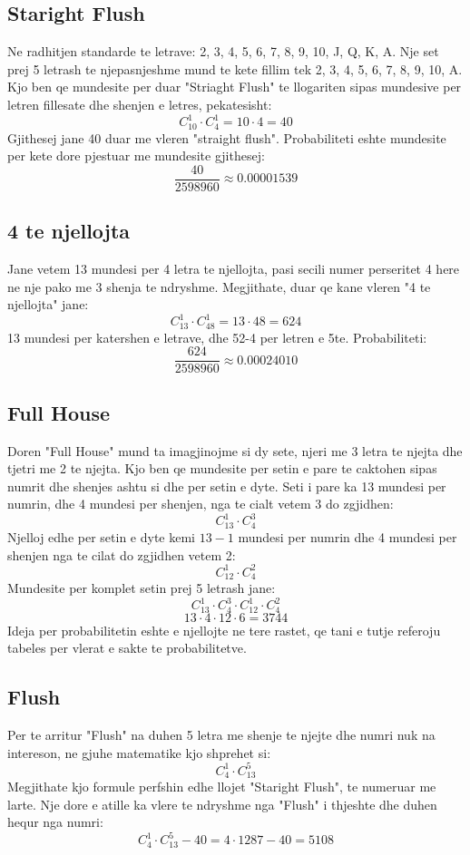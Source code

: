 \documentclass[a4paper]{article}
\begin{document}
\subsection*{Staright Flush}
Ne radhitjen standarde te letrave: 2, 3, 4, 5, 6, 7, 8, 9, 10, J, Q, K, A. Nje set prej 5 letrash te njepasnjeshme mund te kete fillim tek 2, 3, 4, 5, 6, 7, 8, 9, 10, A. Kjo ben qe mundesite per duar "Striaght Flush" te llogariten sipas mundesive per letren fillesate dhe shenjen e letres, pekatesisht: \[
	C^{1}_{10}\cdot C^{1}_{4}=10\cdot 4=40
\] 
Gjithesej jane 40 duar me vleren "straight flush".
Probabiliteti eshte mundesite per kete dore pjestuar me mundesite gjithesej: \[
\frac{40}{2598960}\approx 0.00001539
\]
\subsection*{4 te njellojta}
Jane vetem 13 mundesi per 4 letra te njellojta, pasi secili numer perseritet 4 here ne nje pako me 3 shenja te ndryshme. Megjithate, duar qe kane vleren "4 te njellojta" jane: \[
	C_{13}^{1} \cdot  C_{48}^{1} = 13 \cdot 48 = 624
\] 
13 mundesi per katershen e letrave, dhe 52-4 per letren e 5te.
Probabiliteti: \[
\frac{624}{2598960}\approx 0.00024010
\]
\subsection*{Full House}
Doren "Full House" mund ta imagjinojme si dy sete, njeri me 3 letra te njejta dhe tjetri me 2 te njejta. Kjo ben qe mundesite per setin e pare te caktohen sipas numrit dhe shenjes ashtu si dhe per setin e dyte. Seti i pare ka 13 mundesi per numrin, dhe 4 mundesi per shenjen, nga te cialt vetem 3 do zgjidhen: \[
	C_{13}^{1} \cdot  C_{4}^{3}
\] 
Njelloj edhe per setin e dyte kemi $13-1$ mundesi per numrin dhe 4 mundesi per shenjen nga te cilat do zgjidhen vetem 2: \[
	C_{12}^{1} \cdot  C_{4}^{2}
\]
 Mundesite per komplet setin prej 5 letrash jane:
$$	C_{13}^{1} \cdot  C_{4}^{3} \cdot C_{12}^{1} \cdot  C_{4}^{2}$$
$$	13\cdot 4 \cdot 12\cdot 6 = 3744 $$
Ideja per probabilitetin eshte e njellojte ne tere rastet, qe tani e tutje referoju tabeles per vlerat e sakte te probabilitetve.
\subsection*{Flush}
Per te arritur "Flush" na duhen 5 letra me shenje te njejte dhe numri nuk na intereson, ne gjuhe matematike kjo shprehet si: \[
	C_{4}^{1}\cdot C_{13}^{5}
\]
Megjithate kjo formule perfshin edhe llojet "Staright Flush", te numeruar me larte. Nje dore e atille ka vlere te ndryshme nga "Flush" i thjeshte dhe duhen hequr nga numri: \[
	C_{4}^{1}\cdot C_{13}^{5} - 40 = 4\cdot 1287 -40 = 5108
\]
\end{document}
